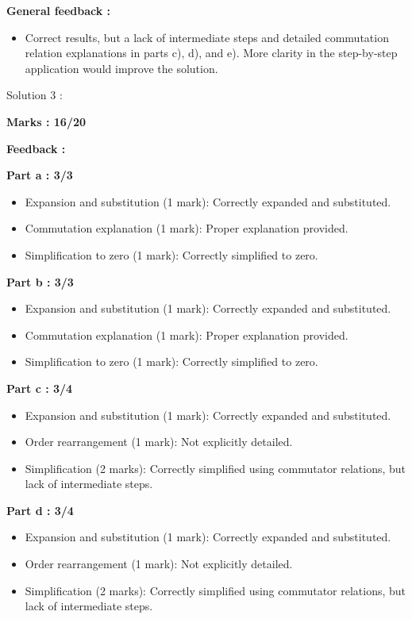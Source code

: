 \documentclass[a4paper,11pt]{article}
\begin{document}
\textbf{General feedback :}

\begin{itemize}
    \item Correct results, but a lack of intermediate steps and detailed commutation relation explanations in parts c), d), and e). More clarity in the step-by-step application would improve the solution.
\end{itemize}




Solution 3 :

\textbf{Marks : 16/20}

\textbf{Feedback :}

\textbf{Part a : 3/3}

\begin{itemize}
    \item Expansion and substitution (1 mark): Correctly expanded and substituted.
    \item Commutation explanation (1 mark): Proper explanation provided.
    \item Simplification to zero (1 mark): Correctly simplified to zero.
\end{itemize}


\textbf{Part b : 3/3}

\begin{itemize}
    \item Expansion and substitution (1 mark): Correctly expanded and substituted.
    \item Commutation explanation (1 mark): Proper explanation provided.
    \item Simplification to zero (1 mark): Correctly simplified to zero.
\end{itemize}


\textbf{Part c : 3/4}

\begin{itemize}
    \item Expansion and substitution (1 mark): Correctly expanded and substituted.
    \item Order rearrangement (1 mark): Not explicitly detailed.
    \item Simplification (2 marks): Correctly simplified using commutator relations, but lack of intermediate steps.
\end{itemize}


\textbf{Part d : 3/4}

\begin{itemize}
    \item Expansion and substitution (1 mark): Correctly expanded and substituted.
    \item Order rearrangement (1 mark): Not explicitly detailed.
    \item Simplification (2 marks): Correctly simplified using commutator relations, but lack of intermediate steps.
\end{itemize}
\end{document}
